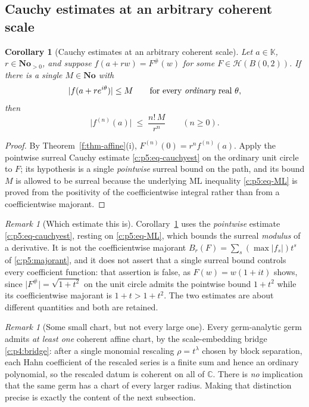 \documentclass[11pt,a4paper]{article}
\numberwithin{equation}{section}
\newtheorem{corollary}[theorem]{Corollary}
\theoremstyle{definition}
\theoremstyle{remark}
\newtheorem{remark}[theorem]{Remark}
\theoremstyle{plain}
\newcommand{\K}{\mathbb K}
\newcommand{\No}{\mathbf{No}}
\newcommand{\CC}{\mathbb C}
\newcommand{\ev}[1]{#1^{\#}}
\newcommand{\Hc}{\mathcal H}
\newcommand{\abs}[1]{\lvert #1\rvert}
\begin{document}
\subsection{Cauchy estimates at an arbitrary coherent scale}
\label{f:sub-scaledcauchy}

\begin{corollary}[Cauchy estimates at an arbitrary coherent
scale]\label{f:cor-scaledCauchy}
Let $a\in\K$, $r\in\No_{>0}$, and suppose $f(a+rw)=\ev F(w)$ for some
$F\in\Hc(B(0,2))$.  If there is a single $M\in\No$ with
\[
 \abs{f(a+re^{i\theta})}\le M
 \qquad\text{for every \emph{ordinary} real }\theta,
\]
then
\begin{equation}\label{f:eq-scaledCauchy}
 \abs{f^{(n)}(a)}\;\le\;\frac{n!\,M}{r^{n}}
 \qquad(n\ge0).
\end{equation}
\end{corollary}

\begin{proof}
By Theorem~\ref{f:thm-affine}(i), $F^{(n)}(0)=r^{n}f^{(n)}(a)$.  Apply
the pointwise surreal Cauchy estimate \ref{c:p5:eq-cauchyest} on the
ordinary unit circle to $F$; its hypothesis is a single \emph{pointwise}
surreal bound on the path, and its bound $M$ is allowed to be surreal
because the underlying $\mathrm{ML}$ inequality \ref{c:p5:eq-ML} is proved
from the positivity of the coefficientwise integral rather than from a
coefficientwise majorant.
\end{proof}

\begin{remark}[Which estimate this is]\label{f:rem-whichestimate}
Corollary~\ref{f:cor-scaledCauchy} uses the \emph{pointwise} estimate
\ref{c:p5:eq-cauchyest}, resting on \ref{c:p5:eq-ML}, which bounds
the surreal \emph{modulus} of a derivative.  It is not the
coefficientwise majorant $B_{r}(F)=\sum_{s}(\max\abs{f_{s}})t^{s}$ of
\ref{c:p5:majorant}, and it does not assert that a single surreal
bound controls every coefficient function: that assertion is false, as
$F(w)=w(1+it)$ shows, since $\abs{\ev F}=\sqrt{1+t^{2}}$ on the unit
circle admits the pointwise bound $1+t^{2}$ while its coefficientwise
majorant is $1+t>1+t^{2}$.  The two estimates are about different
quantities and both are retained.
\end{remark}

\begin{remark}[Some small chart, but not every large one]
\label{f:rem-somechart}
Every germ-analytic germ admits \emph{at least one} coherent affine
chart, by the scale-embedding bridge \ref{c:p4:bridge}: after a
single monomial rescaling $\rho=t^{\lambda}$ chosen by block separation,
each Hahn coefficient of the rescaled series is a finite sum and hence an
ordinary polynomial, so the rescaled datum is coherent on all of $\CC$.
There is \emph{no} implication that the same germ has a chart of every
larger radius.  Making that distinction precise is exactly the content
of the next subsection.
\end{remark}
\end{document}
